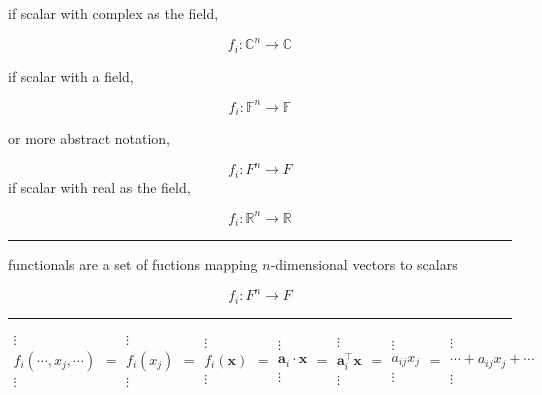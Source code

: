 \documentclass[
]{book}
\theoremstyle{definition}
\theoremstyle{definition}
\theoremstyle{definition}
\theoremstyle{definition}
\theoremstyle{remark}
\begin{document}
if scalar with complex as the field,

\[
f_{{\scriptscriptstyle i}}:\mathbb{C}^{n}\rightarrow\mathbb{C}
\]

if scalar with a field,

\[
f_{{\scriptscriptstyle i}}:\mathbb{F}^{n}\rightarrow\mathbb{F}
\]

or more abstract notation,

\[
f_{{\scriptscriptstyle i}}:F^{n}\rightarrow F
\]
if scalar with real as the field,

\[
f_{{\scriptscriptstyle i}}:\mathbb{R}^{n}\rightarrow\mathbb{R}
\]

\begin{center}\rule{0.5\linewidth}{0.5pt}\end{center}

functionals are a set of fuctions mapping \(n\)-dimensional vectors to scalars

\[
f_{{\scriptscriptstyle i}}:F^{n}\rightarrow F
\]

\begin{center}\rule{0.5\linewidth}{0.5pt}\end{center}

\[
\begin{array}{c}
\vdots\\
f_{{\scriptscriptstyle i}}\left(\cdots,x_{{\scriptscriptstyle j}},\cdots\right)\\
\vdots
\end{array}=\begin{array}{c}
\vdots\\
f_{{\scriptscriptstyle i}}\left(x_{{\scriptscriptstyle j}}\right)\\
\vdots
\end{array}=\begin{array}{c}
\vdots\\
f_{{\scriptscriptstyle i}}\left(\boldsymbol{x}\right)\\
\vdots
\end{array}=\begin{array}{c}
\vdots\\
\boldsymbol{a}_{{\scriptscriptstyle i}}\cdot\boldsymbol{x}\\
\vdots
\end{array}=\begin{array}{c}
\vdots\\
\boldsymbol{a}_{{\scriptscriptstyle i}}^{\intercal}\boldsymbol{x}\\
\vdots
\end{array}=\begin{array}{c}
\vdots\\
a_{{\scriptscriptstyle ij}}x_{{\scriptscriptstyle j}}\\
\vdots
\end{array}=\begin{array}{c}
\vdots\\
\cdots+a_{{\scriptscriptstyle ij}}x_{{\scriptscriptstyle j}}+\cdots\\
\vdots
\end{array}
\]
\end{document}
